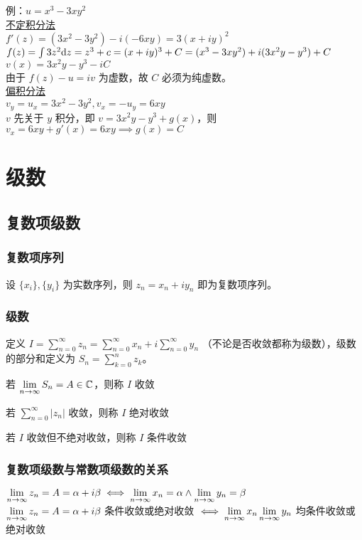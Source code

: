 \documentclass[./main.tex]{subfiles}
\begin{document}
\noindent 例：$u=x^3-3xy^2$\\
\noindent{}\underline{不定积分法}\\
$f'(z)=(3x^2-3y^2)-i(-6xy)=3(x+iy)^2$\\
$f(z)=\int 3z^2\text{d}z=z^3+c=(x+iy)^3+C=(x^3-3xy^2)+i(3x^2y-y^3)+C$\\
$v(x)=3x^2y-y^3-iC$\\
由于 $f(z)-u=iv$ 为虚数，故 $C$ 必须为纯虚数。\\
\noindent{}\underline{偏积分法}\\
$v_y=u_x=3x^2-3y^2,v_x=-u_y=6xy$\\
$v$ 先关于 $y$ 积分，即 $v=3x^2y-y^3+g(x)$，则 $v_x=6xy+g'(x)=6xy\implies g(x)=C$

\section{级数}
\subsection{复数项级数}
\subsubsection{复数项序列}
设 $\{x_i\},\{y_i\}$ 为实数序列，则 $z_n=x_n+iy_n$ 即为复数项序列。
\subsubsection{级数}
定义 $I=\sum_{n=0}^{\infty}z_n=\sum_{n=0}^{\infty}x_n+i\sum_{n=0}^{\infty}y_n$ （不论是否收敛都称为级数），级数的部分和定义为 $S_n=\sum_{k=0}^{n}z_k$。
\begin{enumerate*}
\item 若 $\lim\limits_{n\rightarrow\infty}S_n=A\in\mathbb{C}$，则称 $I$ 收敛
\item 若 $\sum_{n=0}^{\infty}|z_n|$ 收敛，则称 $I$ 绝对收敛
\item 若 $I$ 收敛但不绝对收敛，则称 $I$ 条件收敛
\end{enumerate*}
\subsubsection{复数项级数与常数项级数的关系}
$\lim\limits_{n\rightarrow\infty}z_n=A=\alpha+i\beta\iff \lim\limits_{n\rightarrow\infty} x_n=\alpha\wedge\lim\limits_{n\rightarrow\infty}y_n=\beta$\\
$\lim\limits_{n\rightarrow\infty}z_n=A=\alpha+i\beta$ 条件收敛或绝对收敛 $\iff \lim\limits_{n\rightarrow\infty} x_n \lim\limits_{n\rightarrow\infty}y_n$ 均条件收敛或绝对收敛
\end{document}
